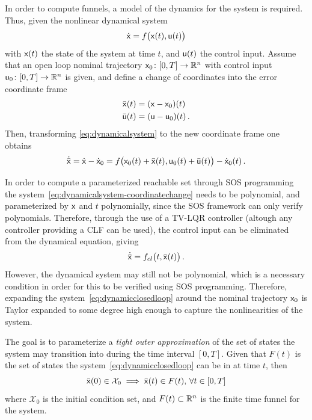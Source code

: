 In order to compute funnels, a model of the dynamics for the system is required.
Thus, given the nonlinear dynamical system
\begin{equation}
  \label{eq:dynamicalsystem}
  \dot{{\mathbf{\mathsf{x}}}} = f\big({\mathbf{\mathsf{x}}}(t), {\mathbf{\mathsf{u}}}(t) \big)
\end{equation}
with \({\mathbf{\mathsf{x}}}(t)\) the state of the system at time \(t\), and \({\mathbf{\mathsf{u}}}(t)\)
the control input. Assume that an open loop nominal trajectory \({\mathbf{\mathsf{x}}}_0
\colon [0,T] \rightarrow \mathbb{R}^n\) with control input \({\mathbf{\mathsf{u}}}_0 \colon [0,T]
\rightarrow \mathbb{R}^n\) is given, and define a change of coordinates into the error
coordinate frame
\begin{align}
  \label{eq:system-error-dynamics}
  \bar{{\mathbf{\mathsf{x}}}}(t) &= ( {\mathbf{\mathsf{x}}} - {\mathbf{\mathsf{x}}}_0 )(t) \\
  \bar{{\mathbf{\mathsf{u}}}}(t) &= ({\mathbf{\mathsf{u}}} - {\mathbf{\mathsf{u}}}_0 )(t) \, .
\end{align}
Then, transforming \cref{eq:dynamicalsystem} to the new coordinate frame one
obtains
\begin{equation}
  \label{eq:dynamicalsystem-coordinatechange}
  \dot{\bar{{\mathbf{\mathsf{x}}}}} = \dot{{\mathbf{\mathsf{x}}}} - \dot{{\mathbf{\mathsf{x}}}}_0 = f\big( {\mathbf{\mathsf{x}}}_0(t) + \bar{{\mathbf{\mathsf{x}}}}(t), {\mathbf{\mathsf{u}}}_0(t) + \bar{{\mathbf{\mathsf{u}}}}(t) \big) - \dot{{\mathbf{\mathsf{x}}}}_0(t) \, .
\end{equation}

In order to compute a parameterized reachable set through \ac{SOS} programming
the system~\cref{eq:dynamicalsystem-coordinatechange} needs to be polynomial,
and parameterized by \({\mathbf{\mathsf{x}}}\) and \(t\) polynomially, since the \ac{SOS}
framework can only verify polynomials. Therefore, through the use of a
\ac{TV-LQR} controller (altough any controller providing a \ac{CLF} can be
used), the control input can be eliminated from the dynamical equation, giving
\begin{equation}
  \label{eq:dynamicclosedloop}
  \dot{\bar{{\mathbf{\mathsf{x}}}}} = f_{cl}\big( t,\bar{{\mathbf{\mathsf{x}}}}(t) \big) \, .
\end{equation}
However, the dynamical system may still not be polynomial, which is a necessary
condition in order for this to be verified using \ac{SOS} programming.
Therefore, expanding the system~\cref{eq:dynamicclosedloop} around the nominal
trajectory \({\mathbf{\mathsf{x}}}_0\) is Taylor expanded to some degree high enough to
capture the nonlinearities of the system.

The goal is to parameterize a \textit{tight outer approximation} of the set of
states the system may transition into during the time interval \([0,T]\). Given
that \(F(t)\) is the set of states the system~\cref{eq:dynamicclosedloop} can be
in at time \(t\), then
\begin{equation}
  \label{eq:reachableset}
  \bar{{\mathbf{\mathsf{x}}}}(0) \in \mathcal{X}_0 \implies \bar{{\mathbf{\mathsf{x}}}}(t) \in F(t), \, \forall t \in [0,T]
\end{equation}
where \(\mathcal{X}_0\) is the initial condition set, and \(F(t) \subset \mathbb{R}^n\)
is the finite time funnel for the system.

